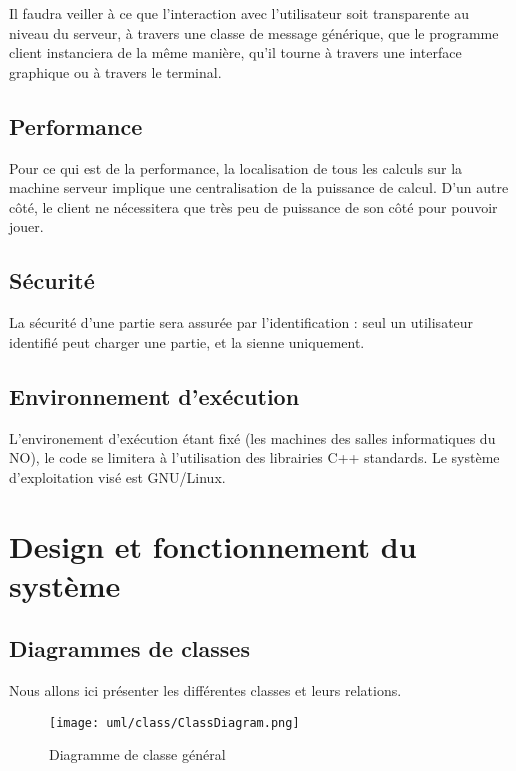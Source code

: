 \documentclass[a4paper,titlepage]{scrreprt}
\begin{document}
  Il faudra veiller à ce que l'interaction avec l'utilisateur soit transparente 
  au niveau du serveur, à travers une classe de message générique, 
  que le programme client instanciera de la même manière, 
  qu'il tourne à travers une interface graphique ou à travers le terminal.
  \subsection{Performance}
  Pour ce qui est de la performance, la localisation de tous les calculs sur la machine serveur 
  implique une centralisation de la puissance de calcul. 
  D'un autre côté, le client ne nécessitera que très peu de puissance de son côté pour pouvoir jouer.
  \subsection{Sécurité}
  La sécurité d'une partie sera assurée par l'identification : 
  seul un utilisateur identifié peut charger une partie, et la sienne uniquement.
  \subsection{Environnement d'exécution}
  L'environement d'exécution étant fixé (les machines des salles informatiques du NO), 
  le code se limitera à l'utilisation des librairies C++ standards. 
  Le système d'exploitation visé est GNU/Linux.
\section{Design et fonctionnement du système}
  \subsection{Diagrammes de classes}
  Nous allons ici présenter les différentes classes et leurs relations.
    \begin{figure}[H]
    \center
    \texttt{[image: uml/class/ClassDiagram.png]}
    \caption{Diagramme de classe général}
  \end{figure}	
\end{document}
